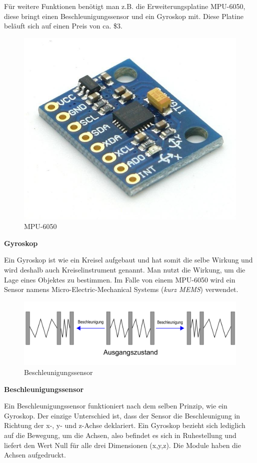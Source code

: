Für weitere Funktionen benötigt man z.B. die Erweiterungsplatine MPU-6050, diese bringt einen Beschleunigungssensor und ein Gyroskop mit. Diese Platine beläuft sich auf einen Preis von ca. \$3.

\begin{figure}[H]
	\centering
	\includegraphics[width=0.7\linewidth]{images/MPU6050.jpg}
	\caption[MPU6050]{MPU-6050}
	\label{fig:MPU6050}
\end{figure}


\textbf{Gyroskop}

Ein Gyroskop ist wie ein Kreisel aufgebaut und hat somit die selbe Wirkung und wird deshalb auch Kreiselinstrument genannt. Man nutzt die Wirkung, um die Lage eines Objektes zu bestimmen. Im Falle von einem MPU-6050 wird ein Sensor namens Micro-Electric-Mechanical Systems (\textit{kurz MEMS}) verwendet. 


\begin{figure}[H]
	\centering
	\includegraphics[width=0.7\linewidth]{images/Beschleunigungssensor.png}
	\caption[Beschleunigungssensor]{Beschleunigungssensor}
	\label{fig:Beschleunigungssensor}
\end{figure}

\textbf{Beschleunigungssensor}

Ein Beschleunigungssensor funktioniert nach dem selben Prinzip, wie ein Gyroskop. Der einzige Unterschied ist, dass der Sensor die Beschleunigung in Richtung der x-, y- und z-Achse deklariert. Ein Gyroskop bezieht sich lediglich auf die Bewegung, um die Achsen, also befindet es sich in Ruhestellung und liefert den Wert Null für alle drei Dimensionen (x,y,z). \textcite{MPU6050} Die Module haben die Achsen aufgedruckt.

